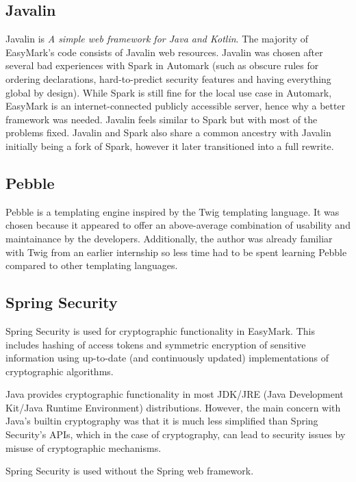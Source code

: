 \documentclass[12pt,a4paper,oneside]{report}
\begin{document}
	\subsection{Javalin}
	Javalin is \emph{A simple web framework for Java and Kotlin}\parencite{javalinwebsite}. The majority of EasyMark's code consists of Javalin web resources. Javalin was chosen after several bad experiences with Spark in Automark (such as obscure rules for ordering declarations, hard-to-predict security features and having everything global by design). While Spark is still fine for the local use case in Automark, EasyMark is an internet-connected publicly accessible server, hence why a better framework was needed. Javalin feels similar to Spark but with most of the problems fixed. Javalin and Spark also share a common ancestry with Javalin initially being a fork of Spark, however it later transitioned into a full rewrite.

	\subsection{Pebble}
	Pebble is a templating engine inspired by the Twig templating language\parencite{pebblewebsite}. It was chosen because it appeared to offer an above-average combination of usability and maintainance by the developers. Additionally, the author was already familiar with Twig from an earlier internship so less time had to be spent learning Pebble compared to other templating languages.

	\subsection{Spring Security}
	Spring Security is used for cryptographic functionality in EasyMark. This includes hashing of access tokens and symmetric encryption of sensitive information using up-to-date (and continuously updated) implementations of cryptographic algorithms\parencite{springsecuritywebsite}.

	\pagebreak
	Java provides cryptographic functionality in most JDK/JRE (Java Development Kit/Java Runtime Environment) distributions. However, the main concern with Java's builtin cryptography was that it is much less simplified than Spring Security's APIs, which in the case of cryptography, can lead to security issues by misuse of cryptographic mechanisms\parencite{javacryptographyusesinthewild}.

	Spring Security is used without the Spring web framework.
\end{document}
